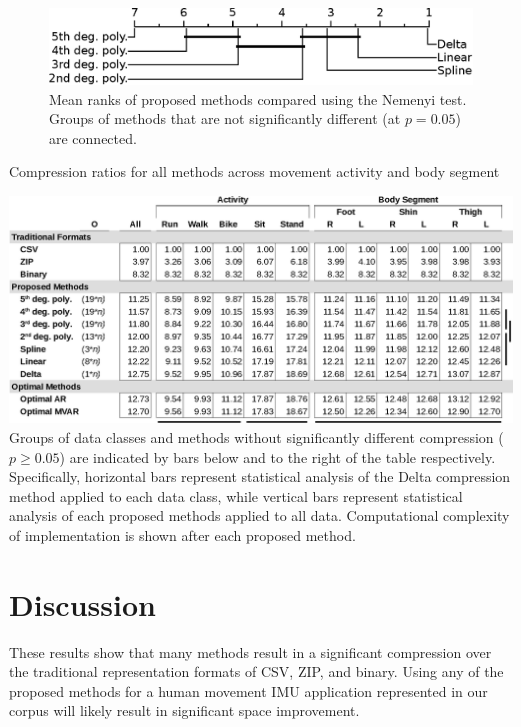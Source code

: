 \documentclass[journal]{IEEEtran}
\begin{document}
\begin{figure}
  \includegraphics[width=\linewidth]{nemenyi.eps}
  \caption{Mean ranks of proposed methods compared using the Nemenyi test. Groups of methods that are not significantly different (at $p = 0.05$) are connected.}
  
  \label{fig:ranks}
\end{figure}

\begin{table}[htbp]
\caption{Compression ratios for all methods across movement activity and body segment}
\includegraphics[width=\linewidth]{results_record.eps}
Groups of data classes and methods without significantly different compression ($p\geq0.05$) are indicated by bars below and to the right of the table respectively. Specifically, horizontal bars represent statistical analysis of the Delta compression method applied to each data class, while vertical bars represent statistical analysis of each proposed methods applied to all data. Computational complexity of implementation is shown after each proposed method.
\label{table:all_stats}
\end{table}

\section{Discussion}

These results show that many methods result in a significant compression over the traditional representation formats of CSV, ZIP, and binary. Using any of the proposed methods for a human movement IMU application represented in our corpus will likely result in significant space improvement.
\end{document}
